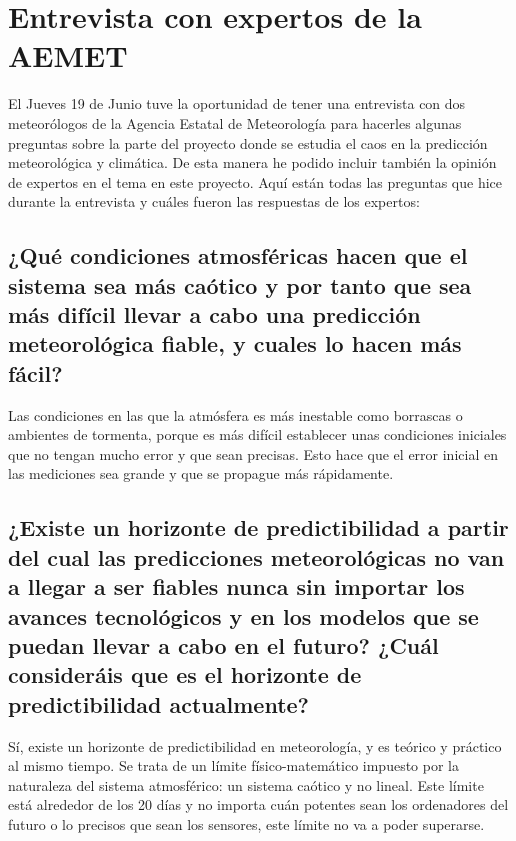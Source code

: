 \documentclass[
  10pt,
  a4paper,
  DIV=11,
  numbers=noendperiod,
  open=any]{scrreprt}
\numberwithin{equation}{chapter}
\numberwithin{equation}{chapter}
\renewcommand{\[}{\begin{equation}}
\renewcommand{\]}{\end{equation}}
\begin{document}
\chapter{Entrevista con expertos de la
AEMET}\label{entrevista-con-expertos-de-la-aemet}

El Jueves 19 de Junio tuve la oportunidad de tener una entrevista con
dos meteorólogos de la Agencia Estatal de Meteorología para hacerles
algunas preguntas sobre la parte del proyecto donde se estudia el caos
en la predicción meteorológica y climática. De esta manera he podido
incluir también la opinión de expertos en el tema en este proyecto. Aquí
están todas las preguntas que hice durante la entrevista y cuáles fueron
las respuestas de los expertos:

\section{¿Qué condiciones atmosféricas hacen que el sistema sea más
caótico y por tanto que sea más difícil llevar a cabo una predicción
meteorológica fiable, y cuales lo hacen más
fácil?}\label{quuxe9-condiciones-atmosfuxe9ricas-hacen-que-el-sistema-sea-muxe1s-cauxf3tico-y-por-tanto-que-sea-muxe1s-difuxedcil-llevar-a-cabo-una-predicciuxf3n-meteoroluxf3gica-fiable-y-cuales-lo-hacen-muxe1s-fuxe1cil}

Las condiciones en las que la atmósfera es más inestable como borrascas
o ambientes de tormenta, porque es más difícil establecer unas
condiciones iniciales que no tengan mucho error y que sean precisas.
Esto hace que el error inicial en las mediciones sea grande y que se
propague más rápidamente.

\section{¿Existe un horizonte de predictibilidad a partir del cual las
predicciones meteorológicas no van a llegar a ser fiables nunca sin
importar los avances tecnológicos y en los modelos que se puedan llevar
a cabo en el futuro? ¿Cuál consideráis que es el horizonte de
predictibilidad
actualmente?}\label{existe-un-horizonte-de-predictibilidad-a-partir-del-cual-las-predicciones-meteoroluxf3gicas-no-van-a-llegar-a-ser-fiables-nunca-sin-importar-los-avances-tecnoluxf3gicos-y-en-los-modelos-que-se-puedan-llevar-a-cabo-en-el-futuro-cuuxe1l-consideruxe1is-que-es-el-horizonte-de-predictibilidad-actualmente}

Sí, existe un horizonte de predictibilidad en meteorología, y es teórico
y práctico al mismo tiempo. Se trata de un límite físico-matemático
impuesto por la naturaleza del sistema atmosférico: un sistema caótico y
no lineal. Este límite está alrededor de los 20 días y no importa cuán
potentes sean los ordenadores del futuro o lo precisos que sean los
sensores, este límite no va a poder superarse.
\end{document}
